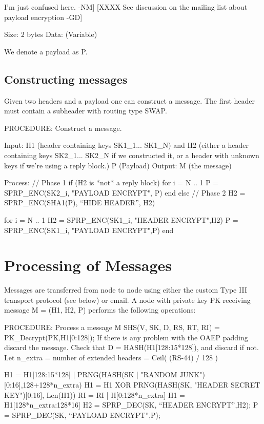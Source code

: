      I'm just confused here. -NM]
[XXXX See discussion on the mailing list about payload encryption -GD]

Size:   2 bytes
Data:   (Variable)

We denote a payload as P.

\subsection{Constructing messages}

Given two headers and a payload one can construct a
message. The first header must contain a subheader
with routing type SWAP.  

PROCEDURE: Construct a message.

Input: H1 (header containing keys SK1_1... SK1_N)
       and H2 (either a header containing keys SK2_1... SK2_N if
         we constructed it, or a header with unknown keys if we're
         using a reply block.)
       P (Payload)
Output: M (the message)

Process:
	// Phase 1
	if (H2 is *not* a reply block)
		for i = N .. 1
	            P = SPRP_ENC(SK2_i, "PAYLOAD ENCRYPT", P)
		end
        else
	// Phase 2
	H2 = SPRP_ENC(SHA1(P), ``HIDE HEADER'', H2)

	for i = N .. 1
		H2 = SPRP_ENC(SK1_i, "HEADER ENCRYPT",H2)
		P = SPRP_ENC(SK1_i, "PAYLOAD ENCRYPT",P)
	end

\section{Processing of Messages}

Messages are transferred from node to node using either the custom Type
III transport protocol (see below) or email.  A node with private key
PK receiving message M = (H1, H2, P) performs the following operations:

PROCEDURE: Process a message M
	SHS(V, SK, D, RS, RT, RI) = PK_Decrypt(PK,H1[0:128]);
        If there is any problem with the OAEP padding discard the message.
        Check that D = HASH(H1[128:15*128]), and discard if not.
        Let n_extra = number of extended headers = Ceil( (RS-44) / 128 )
                  
        H1 = H1[128:15*128] | PRNG(HASH(SK | "RANDOM 
                                               JUNK")[0:16],128+128*n_extra)
	H1 = H1 XOR PRNG(HASH(SK, "HEADER SECRET KEY")[0:16], Len(H1))
        RI = RI | H[0:128*n_extra]
        H1 = H1[128*n_extra:128*16]
	H2 = SPRP_DEC(SK, ``HEADER ENCRYPT'',H2);
	P = SPRP_DEC(SK, ``PAYLOAD ENCRYPT'',P);

